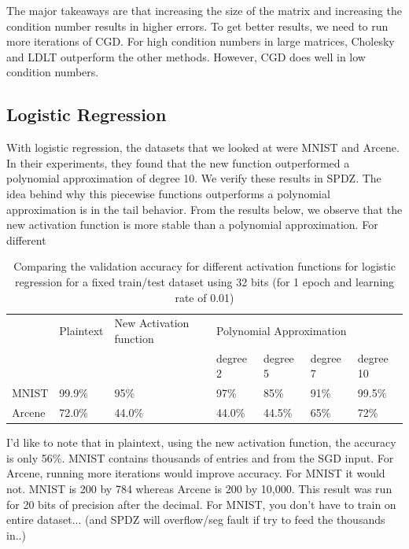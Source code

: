 \documentclass{article}
\theoremstyle{plain}
\theoremstyle{definition}
\theoremstyle{remark}
\begin{document}
\noindent
The major takeaways are that increasing the size of the matrix and increasing the condition number results in higher errors. To get better results, we need to run more iterations of CGD. For high condition numbers in large matrices, Cholesky and LDLT outperform the other methods. However, CGD does well in low condition numbers. 

\subsection{Logistic Regression}

\noindent
With logistic regression, the datasets that we looked at were MNIST and Arcene. In their experiments, they found that the new function outperformed a polynomial approximation of degree 10. We verify these results in SPDZ. The idea behind why this piecewise functions outperforms a polynomial approximation is in the tail behavior. From the results below, we observe that the new activation function is more stable than a polynomial approximation. For different 

\begin{table}[H]
\centering
\label{my-label}
\begin{tabular}{@{}lllllll@{}}
\toprule
       & Plaintext & New Activation function & \multicolumn{4}{l}{Polynomial Approximation} \\
       &           &                         & degree 2  & degree 5  & degree 7 & degree 10 \\ \midrule
MNIST  & 99.9\%    & 95\%                    & 97\%      & 85\%      & 91\%     & 99.5\%    \\
Arcene & 72.0\%    &           44.0\%              &   44.0\%        &    44.5\%       &    65\%      &    72\%       \\ \bottomrule
\end{tabular}
\caption{Comparing the validation accuracy for different activation functions for logistic regression for a fixed train/test dataset using 32 bits (for 1 epoch and learning rate of 0.01)}
\end{table}

I'd like to note that in plaintext, using the new activation function, the accuracy is only 56\%. MNIST contains thousands of entries and from the SGD input. For Arcene, running more iterations would improve accuracy. For MNIST it would not. MNIST is 200 by 784 whereas Arcene is 200 by 10,000. This result was run for 20 bits of precision after the decimal. For MNIST, you don't have to train on entire dataset... (and SPDZ will overflow/seg fault if try to feed the thousands in..)
\end{document}
